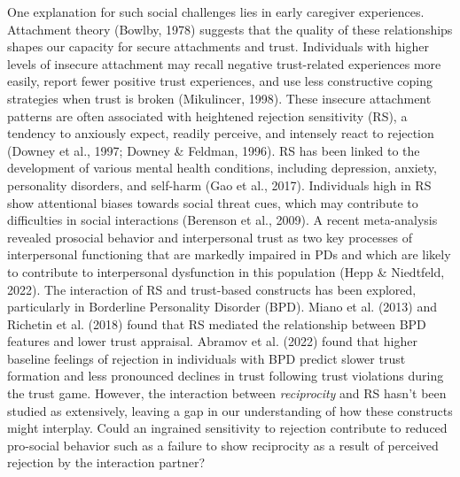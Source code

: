 \documentclass[
]{article}
\begin{document}
One explanation for such social challenges lies in early caregiver
experiences. Attachment theory (Bowlby, 1978) suggests that
the quality of these relationships shapes our capacity for secure
attachments and trust. Individuals with higher levels of insecure
attachment may recall negative trust-related experiences more easily,
report fewer positive trust experiences, and use less constructive
coping strategies when trust is broken (Mikulincer, 1998).
These insecure attachment patterns are often associated with heightened
rejection sensitivity (RS), a tendency to anxiously expect, readily
perceive, and intensely react to rejection (Downey et al., 1997; Downey \& Feldman, 1996). RS has been linked to the development of various
mental health conditions, including depression, anxiety, personality
disorders, and self-harm (Gao et al., 2017). Individuals high in
RS show attentional biases towards social threat cues, which may
contribute to difficulties in social interactions
(Berenson et al., 2009). A recent meta-analysis revealed prosocial
behavior and interpersonal trust as two key processes of interpersonal
functioning that are markedly impaired in PDs and which are likely to
contribute to interpersonal dysfunction in this population
(Hepp \& Niedtfeld, 2022). The interaction of RS and trust-based
constructs has been explored, particularly in Borderline Personality
Disorder (BPD). Miano et al. (2013) and Richetin et al. (2018) found
that RS mediated the relationship between BPD features and lower trust
appraisal. Abramov et al. (2022) found that higher baseline feelings
of rejection in individuals with BPD predict slower trust formation and
less pronounced declines in trust following trust violations during the
trust game. However, the interaction between \emph{reciprocity} and RS hasn't
been studied as extensively, leaving a gap in our understanding of how
these constructs might interplay. Could an ingrained sensitivity to
rejection contribute to reduced pro-social behavior such as a failure to
show reciprocity as a result of perceived rejection by the interaction
partner?
\end{document}
